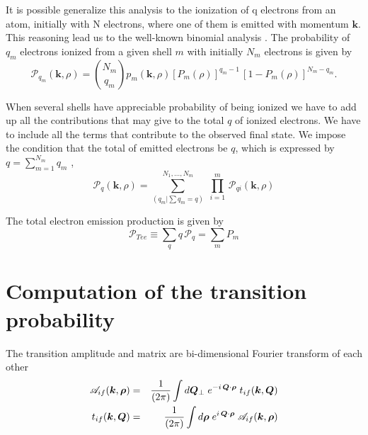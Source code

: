 It is possible generalize this analysis to the ionization of q
electrons from an atom, initially with N electrons, where one of them
is emitted with momentum $\bm{k}$. This reasoning lead us to the
well-known binomial analysis \autocite[see, for instance,][]{Mcguire1991AAMOP_MEIp217}. The probability of
$q_{m}$ electrons ionized from a given shell $m$ with initially $N_{m}$
electrons  is given by
\begin{equation} \label{Q:qionshllPrb}
\mathcal{P}_{q_{m}}(\bm{k},\rho) =  {N_{m} \choose q_{m}}
p_{m}(\bm{k},\rho) \left[ P_{m} (\rho) \right]^{q_{m}-1} \, \left[ 1 -
P_{m}(\rho) \right]^{N_{m}-q_{m}}.
\end{equation}

When several shells have appreciable probability of being ionized we
have to add up all the contributions that may give to the total $q$ of
ionized electrons. We have to include all the terms that contribute to
the observed final state. We impose the condition that the total of
emitted electrons be $q$, which is expressed by $q = \sum_{m=1}^{N_{m}}
q_{m}$ \autocite{Mcguire1991AAMOP_MEIp217,Kirchne2002PRAp42727},
\begin{equation}\label{Q:qionPrb}
\mathcal{P}_{q}(\bm{k},\rho) = \sum_{\left( q_{m} | \sum q_{m}=q
\right)}^{N_{1},\ldots,N_{m}} \;\prod_{i=1}^{m}
  \,\mathcal{P}_{qi}(\bm{k},\rho)
\end{equation}

The total electron emission production is given by
\begin{equation}\label{Q:TEEPrb}
\mathcal{P}_{Tee} \equiv \sum_{q} q \, \mathcal{P}_{q} = \sum_{m} P_{m}
\end{equation}


\section{Computation of the transition probability}
\label{S:Compu-trans-proba}

The transition amplitude and matrix are bi-dimensional Fourier
transform of each other
\begin{eqnarray}\label{Q:prob1}
\mathcal{A}_{if}(\bm{k},\boldsymbol{\rho}) &=& \frac{1}{(2 \pi)} \int d
\bm{Q}_{\perp} \;
e^{- i \, \bm{Q} \cdot \boldsymbol{\rho} } \; t_{if}(\bm{k},\bm{Q}) \\
t_{if}(\bm{k},\bm{Q}) &=& \frac{1}{(2 \pi)} \int d \boldsymbol{\rho} \;
e^{i \, \bm{Q} \cdot \boldsymbol{\rho} } \;\mathcal{A}_{if}(\bm{k},\boldsymbol{\rho})
\end{eqnarray}

